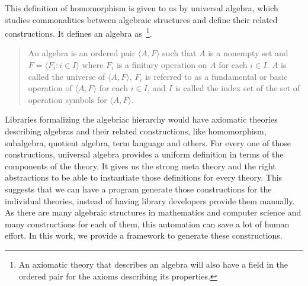 This definition of homomorphism is given to us by universal algebra, which studies commonalities between algebraic structures and define their related constructions.
It defines an algebra as~\cite{mckenzie1987algebras}\footnote{An axiomatic theory that describes an algebra will also have a field in the ordered pair for the axioms describing its properties.}. 
\begin{quote}
    An algebra is an ordered pair $\langle A, F \rangle$ such that $A$ is a nonempty set and $F = \langle F_i : i \in I \rangle$ where $F_i$ is a finitary operation on $A$ for each $i \in I$. $A$ is called the universe of $\langle A, F \rangle$, $F_i$ is referred to as a fundamental or basic operation of $\langle A, F \rangle$ for each $i \in I$, and $I$ is called the index set of the set of operation symbols for $\langle A, F \rangle$. 
\end{quote}
Libraries formalizing the algebriac hierarchy would have axiomatic theories describing algebras and their related constructions, like homomorphism, subalgebra, quotient algebra, term language and others. 
For every one of those constructions, universal algebra provides a uniform definition in terms of the components of the theory. 
It gives us the strong meta theory and the right abstractions to be able to instantiate those definitions for every theory. This suggests that we can have a program generate those constructions for the individual theories, instead of having library developers provide them manually. As there are many algebraic structures in mathematics and computer science and many constructions for each of them, this automation can save a lot of human effort. In this work, we provide a framework to generate these constructions. 

